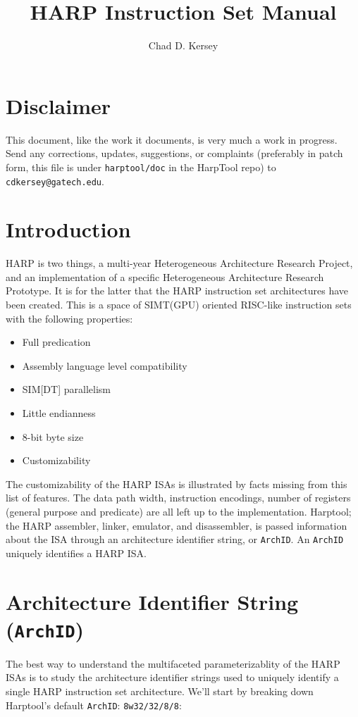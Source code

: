 \documentclass[10pt,letterpaper]{article}
\title{HARP Instruction Set Manual}
\author{Chad D. Kersey}
\begin{document}
\maketitle
\section*{Disclaimer}
This document, like the work it documents, is very much a work in progress.
Send any corrections, updates, suggestions, or complaints (preferably in patch form, this file is under \texttt{harptool/doc} in the HarpTool repo) to \texttt{cdkersey@gatech.edu}.

\section*{Introduction}
HARP is two things, a multi-year Heterogeneous Architecture Research Project, and an implementation of a specific Heterogeneous Architecture Research Prototype.
It is for the latter that the HARP instruction set architectures have been created.
This is a space of SIMT(GPU) oriented RISC-like instruction sets with the following properties:

\begin{itemize}
  \item{Full predication}
  \item{Assembly language level compatibility}
  \item{SIM[DT] parallelism}
  \item{Little endianness}
  \item{8-bit byte size}
  \item{Customizability}
\end{itemize}

The customizability of the HARP ISAs is illustrated by facts missing from this list of features.
The data path width, instruction encodings, number of registers (general purpose and predicate) are all left up to the implementation.
Harptool; the HARP assembler, linker, emulator, and disassembler, is passed information about the ISA through an architecture identifier string, or \texttt{ArchID}.
An \texttt{ArchID} uniquely identifies a HARP ISA.

\section{Architecture Identifier String (\texttt{ArchID})}
The best way to understand the multifaceted parameterizablity of the HARP ISAs is to study the architecture identifier strings used to uniquely identify a single HARP instruction set architecture.
We'll start by breaking down Harptool's default \texttt{ArchID}: \texttt{8w32/32/8/8}:
\end{document}
